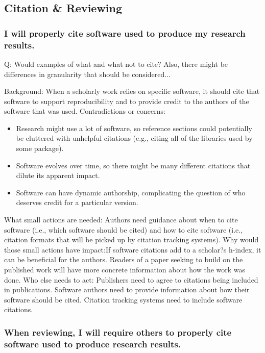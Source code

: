 \documentclass[a4paper,UKenglish]{dagman}
\renewcommand{\paragraph}[1]{\subsubsection*{#1}\xspace}
\begin{document}
\subsection{Citation \& Reviewing}

\paragraph{I will properly cite software used to produce my research results.}

Q: Would examples of what and what not to cite? Also, there might be differences in granularity that should be considered...


Background: When a scholarly work relies on specific software, it should cite that software to support reproducibility and to provide credit to the authors of the software that was used.
Contradictions or concerns: 
\begin{itemize}
\item Research might use a lot of software, so reference sections could potentially be cluttered with unhelpful citations (e.g., citing all of the libraries used by some package). 
\item Software evolves over time, so there might be many different citations that dilute its apparent impact. 
\item Software can have dynamic authorship, complicating the question of who deserves credit for a particular version. 
\end{itemize}

What small actions are needed: Authors need guidance about when to cite software (i.e., which software should be cited) and how to cite software (i.e., citation formats that will be picked up by citation tracking systems). 
Why would those small actions have impact:If software citations add to a scholar?s h-index, it can be beneficial for the authors. Readers of a paper seeking to build on the published work will have more concrete information about how the work was done. 
Who else needs to act: Publishers need to agree to citations being included in publications. Software authors need to provide information about how their software should be cited. Citation tracking systems need to include software citations. 


\paragraph{When reviewing, I will require others to properly cite software used to produce research results.}
\end{document}
